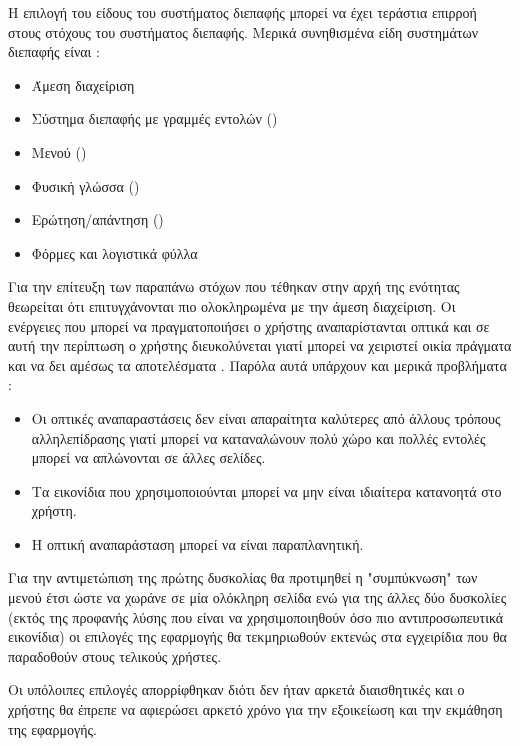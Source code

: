 \documentclass{assignment}
\begin{document}
Η επιλογή του είδους του συστήματος διεπαφής μπορεί να έχει τεράστια επιρροή στους στόχους του συστήματος διεπαφής. Μερικά συνηθισμένα είδη συστημάτων διεπαφής είναι \cite{class_notes}:

\begin{itemize}
\item Άμεση διαχείριση
\item Σύστημα διεπαφής με γραμμές εντολών ()
\item Μενού ()
\item Φυσική γλώσσα ()
\item Ερώτηση/απάντηση ()
\item Φόρμες και λογιστικά φύλλα
\end{itemize}

Για την επίτευξη των παραπάνω στόχων που τέθηκαν στην αρχή της ενότητας θεωρείται ότι επιτυγχάνονται πιο ολοκληρωμένα με την άμεση διαχείριση. Οι ενέργειες που μπορεί να πραγματοποιήσει ο χρήστης αναπαρίστανται οπτικά και σε αυτή την περίπτωση ο χρήστης διευκολύνεται γιατί μπορεί να χειριστεί οικία πράγματα και να δει αμέσως τα αποτελέσματα \cite{class_notes}. Παρόλα αυτά υπάρχουν και μερικά προβλήματα \cite{class_notes}:

\begin{itemize}
\item Οι οπτικές αναπαραστάσεις δεν είναι απαραίτητα καλύτερες από άλλους τρόπους αλληλεπίδρασης γιατί μπορεί να καταναλώνουν πολύ χώρο και πολλές εντολές μπορεί να απλώνονται σε άλλες σελίδες.
\item Τα εικονίδια που χρησιμοποιούνται μπορεί να μην είναι ιδιαίτερα κατανοητά στο χρήστη.
\item Η οπτική αναπαράσταση μπορεί να είναι παραπλανητική.
\end{itemize}

Για την αντιμετώπιση της πρώτης δυσκολίας θα προτιμηθεί η "συμπύκνωση" των μενού έτσι ώστε να χωράνε σε μία ολόκληρη σελίδα ενώ για της άλλες δύο δυσκολίες (εκτός της προφανής λύσης που είναι να χρησιμοποιηθούν όσο πιο αντιπροσωπευτικά εικονίδια) οι επιλογές της εφαρμογής θα τεκμηριωθούν εκτενώς στα εγχειρίδια που θα παραδοθούν στους τελικούς χρήστες.

Οι υπόλοιπες επιλογές απορρίφθηκαν διότι δεν ήταν αρκετά διαισθητικές και ο χρήστης θα έπρεπε να αφιερώσει αρκετό χρόνο για την εξοικείωση και την εκμάθηση της εφαρμογής.

\end{document}
